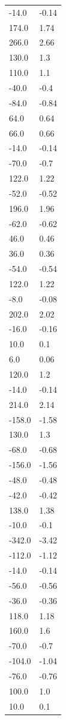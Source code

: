 \begin{longtable}{ll}
-14.0 & -0.14 \\
174.0 & 1.74 \\
266.0 & 2.66 \\
130.0 & 1.3 \\
110.0 & 1.1 \\
-40.0 & -0.4 \\
-84.0 & -0.84 \\
64.0 & 0.64 \\
66.0 & 0.66 \\
-14.0 & -0.14 \\
-70.0 & -0.7 \\
122.0 & 1.22 \\
-52.0 & -0.52 \\
196.0 & 1.96 \\
-62.0 & -0.62 \\
46.0 & 0.46 \\
36.0 & 0.36 \\
-54.0 & -0.54 \\
122.0 & 1.22 \\
-8.0 & -0.08 \\
202.0 & 2.02 \\
-16.0 & -0.16 \\
10.0 & 0.1 \\
6.0 & 0.06 \\
120.0 & 1.2 \\
-14.0 & -0.14 \\
214.0 & 2.14 \\
-158.0 & -1.58 \\
130.0 & 1.3 \\
-68.0 & -0.68 \\
-156.0 & -1.56 \\
-48.0 & -0.48 \\
-42.0 & -0.42 \\
138.0 & 1.38 \\
-10.0 & -0.1 \\
-342.0 & -3.42 \\
-112.0 & -1.12 \\
-14.0 & -0.14 \\
-56.0 & -0.56 \\
-36.0 & -0.36 \\
118.0 & 1.18 \\
160.0 & 1.6 \\
-70.0 & -0.7 \\
-104.0 & -1.04 \\
-76.0 & -0.76 \\
100.0 & 1.0 \\
10.0 & 0.1 \\

\end{longtable}

